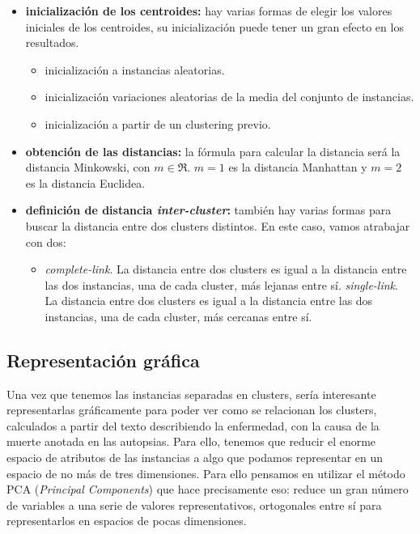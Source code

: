 \documentclass[10pt,a4paper]{article}
\begin{document}
\begin{itemize}
\item \textbf{inicialización de los centroides:} hay varias formas de elegir los valores iniciales de los centroides, su inicialización puede tener un gran efecto en los resultados.
    \begin{itemize}
    \item inicialización a instancias aleatorias.
    \item inicialización variaciones aleatorias de la media del conjunto de instancias.
    \item inicialización a partir de un clustering previo.
    \end{itemize}
\item \textbf{obtención de las distancias:} la fórmula para calcular la distancia será la distancia Minkowski, con \(m \in \Re\). \(m=1\) es la distancia Manhattan y \(m=2\) es la distancia Euclidea.
\item \textbf{definición de distancia \textit{inter-cluster}:} también hay varias formas para buscar la distancia entre dos clusters distintos. En este caso, vamos atrabajar con dos:
    \begin{itemize}
    \item \textit{complete-link}. La distancia entre dos clusters es igual a la distancia entre las dos instancias, una de cada cluster, más lejanas entre sí.
    \textit{single-link}. La distancia entre dos clusters es igual a la distancia entre las dos instancias, una de cada cluster, más cercanas entre sí.
    \end{itemize}

\end{itemize}

\subsection{Representación gráfica}
Una vez que tenemos las instancias separadas en clusters, sería interesante representarlas gráficamente para poder ver como se relacionan los clusters, calculados a partir del texto describiendo la enfermedad, con la causa de la muerte anotada en las autopsias. Para ello, tenemos que reducir el enorme espacio de atributos de las instancias a algo que podamos representar en un espacio de no más de tres dimensiones. Para ello pensamos en utilizar el método PCA (\textit{Principal Components}) que hace precisamente eso: reduce un gran número de variables a una serie de valores representativos, ortogonales entre sí para representarlos en espacios de pocas dimensiones.\\
\end{document}
